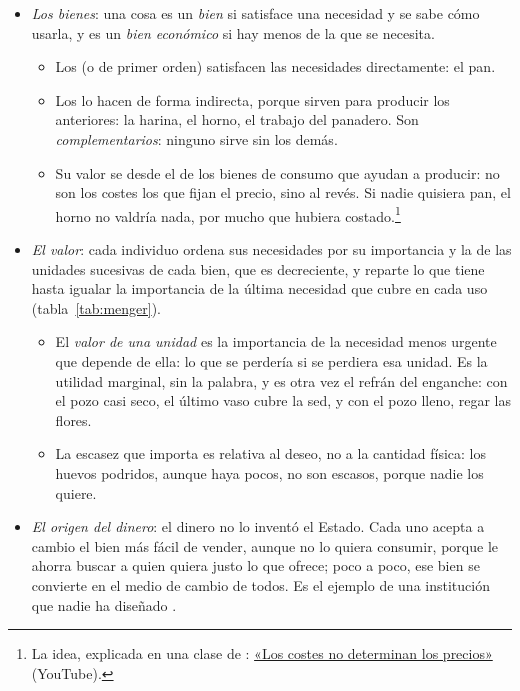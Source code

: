 \documentclass[11pt]{article}
\begin{document}
\begin{itemize}
\item \emph{Los bienes}: una cosa es un \emph{bien} si satisface una necesidad y se sabe cómo usarla, y es un \emph{bien económico} si hay menos de la que se necesita.
  \begin{itemize}
  \item Los  (o de primer orden) satisfacen las necesidades directamente: el pan.
  \item Los  lo hacen de forma indirecta, porque sirven para producir los anteriores: la harina, el horno, el trabajo del panadero. Son \emph{complementarios}: ninguno sirve sin los demás.
  \item Su valor se  desde el de los bienes de consumo que ayudan a producir: no son los costes los que fijan el precio, sino al revés\nocite{Menger1871Grundsatze}. Si nadie quisiera pan, el horno no valdría nada, por mucho que hubiera costado.\footnote{La idea, explicada en una clase de : \href{https://www.youtube.com/watch?v=78z1t0eKlOE}{«Los costes no determinan los precios»} (YouTube).}
  \end{itemize}
\item \emph{El valor}: cada individuo ordena sus necesidades por su importancia y la de las unidades sucesivas de cada bien, que es decreciente, y reparte lo que tiene hasta igualar la importancia de la última necesidad que cubre en cada uso (tabla~\ref{tab:menger}).
  \begin{itemize}
  \item El \emph{valor de una unidad} es la importancia de la necesidad menos urgente que depende de ella: lo que se perdería si se perdiera esa unidad. Es la utilidad marginal, sin la palabra, y es otra vez el refrán del enganche: con el pozo casi seco, el último vaso cubre la sed, y con el pozo lleno, regar las flores.
  \item La escasez que importa es relativa al deseo, no a la cantidad física: los huevos podridos, aunque haya pocos, no son escasos, porque nadie los quiere\nocite{Robbins1932Essay}.
  \end{itemize}
\item \emph{El origen del dinero}: el dinero no lo inventó el Estado. Cada uno acepta a cambio el bien más fácil de vender, aunque no lo quiera consumir, porque le ahorra buscar a quien quiera justo lo que ofrece; poco a poco, ese bien se convierte en el medio de cambio de todos\nocite{Menger1892Origin}. Es el ejemplo de una institución que nadie ha diseñado .
\end{itemize}
\end{document}
